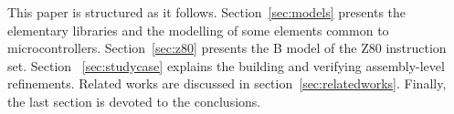 \documentclass[a4paper]{llncs}
\begin{document}
This paper is structured as it follows. %
Section~\ref{sec:models} presents the elementary libraries and
the modelling of some elements common to microcontrollers.  Section~\ref{sec:z80}
presents the B model of the Z80 instruction set. %
Section ~\ref{sec:studycase} explains the building and verifying assembly-level refinements. Related works are discussed in
section~\ref{sec:relatedworks}. Finally, the last section is devoted to the conclusions.
%
%
%
%
%
%
%
\end{document}
